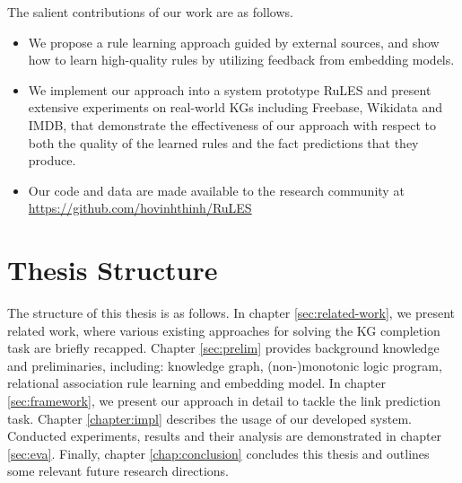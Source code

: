 The salient contributions of our work are as follows.
\begin{itemize}
\item We propose a rule learning approach  guided by external sources, and show how to
learn high-quality rules by utilizing feedback from embedding models. 
%
%
%
%
%  
%  
  \item We implement our approach into a system prototype RuLES and present extensive experiments on real-world KGs including Freebase, Wikidata and IMDB, that demonstrate the effectiveness of our approach with respect to both the quality of the learned rules and the fact predictions that they produce.
%  
\item Our code and data %
are made available to the research community at\\
\url{https://github.com/hovinhthinh/RuLES}
\end{itemize}

\section{Thesis Structure}
The structure of this thesis is as follows. In chapter \ref{sec:related-work}, we 
present related work, where various existing approaches for solving the KG completion task are briefly recapped. Chapter \ref{sec:prelim} provides background knowledge and preliminaries, including: knowledge graph, (non-)monotonic logic program, relational association rule learning and embedding model. In chapter \ref{sec:framework}, we present our approach in detail to tackle the link prediction task. Chapter \ref{chapter:impl} describes the usage of our developed system. Conducted experiments, results and their analysis are demonstrated in chapter \ref{sec:eva}. Finally, chapter \ref{chap:conclusion} concludes this thesis and outlines some relevant future research directions.

